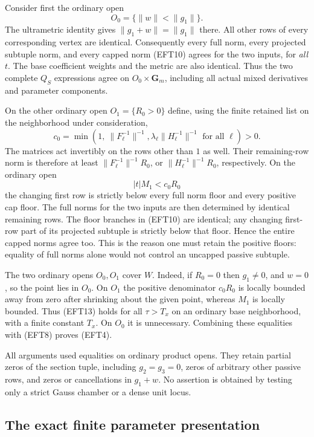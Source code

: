 Consider first the ordinary open
\[
                  O_0=\{\|w\|<\|g_1\|\}.
 \tag{EFT11}
\]
The ultrametric identity gives $\|g_1+w\|=\|g_1\|$ there.
All other rows of every corresponding vertex are identical.
Consequently every full norm, every projected subtuple norm,
and every capped norm (EFT10) agrees for the two inputs, for
\emph{all} $t$.  The base coefficient weights and the metric
are also identical.  Thus the two complete $Q_S$ expressions
agree on $O_0\times\mathbf G_m$, including all actual mixed
derivatives and parameter components.

On the other ordinary open $O_1=\{R_0>0\}$ define, using the
finite retained list on the neighborhood under consideration,
\[
 c_0=\min\left(1,\ \|F_\ell^{-1}\|^{-1},
                   \lambda_\ell\|H_\ell^{-1}\|^{-1}
                                    \text{ for all }\ell\right)>0.
 \tag{EFT12}
\]
The matrices act invertibly on the rows other than $1$ as well.
Their remaining-row norm is therefore at least
$\|F_\ell^{-1}\|^{-1}R_0$, or
$\|H_\ell^{-1}\|^{-1}R_0$, respectively.  On the ordinary open
\[
                        |t|M_1<c_0R_0
 \tag{EFT13}
\]
the changing first row is strictly below every full norm floor
and every positive cap floor.  The full norms for the two inputs
are then determined by identical remaining rows.  The floor
branches in (EFT10) are identical; any changing first-row part
of its projected subtuple is strictly below that floor.
Hence the entire capped norms agree too.  This is the reason
one must retain the positive floors: equality of full norms
alone would not control an uncapped passive subtuple.

The two ordinary opens $O_0,O_1$ cover $W$.  Indeed, if $R_0=0$
then $g_1\ne0$, and $w=0$, so the point lies in $O_0$.
On $O_1$ the positive denominator $c_0R_0$ is locally bounded
away from zero after shrinking about the given point, whereas
$M_1$ is locally bounded.  Thus (EFT13) holds for all
$\tau>T_x$ on an ordinary base neighborhood, with a finite
constant $T_x$.  On $O_0$ it is unnecessary.  Combining these
equalities with (EFT8) proves (EFT4).

All arguments used equalities on ordinary product opens.
They retain partial zeros of the section tuple, including
$g_2=g_3=0$, zeros of arbitrary other passive rows, and zeros
or cancellations in $g_1+w$.  No assertion is obtained by
testing only a strict Gauss chamber or a dense unit locus.

\subsection{The exact finite parameter presentation}

